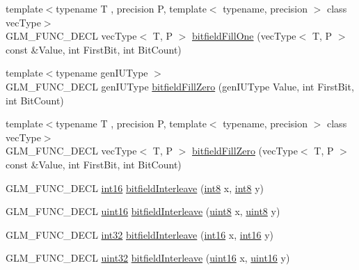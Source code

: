 \begin{DoxyCompactItemize}
\item 
{\footnotesize template$<$typename T , precision P, template$<$ typename, precision $>$ class vec\+Type$>$ }\\G\+L\+M\+\_\+\+F\+U\+N\+C\+\_\+\+D\+E\+C\+L vec\+Type$<$ T, P $>$ \hyperlink{group__gtc__bitfield_gad789042e84e8292ae95dc1af856f2ad5}{bitfield\+Fill\+One} (vec\+Type$<$ T, P $>$ const \&Value, int First\+Bit, int Bit\+Count)
\item 
{\footnotesize template$<$typename gen\+I\+U\+Type $>$ }\\G\+L\+M\+\_\+\+F\+U\+N\+C\+\_\+\+D\+E\+C\+L gen\+I\+U\+Type \hyperlink{group__gtc__bitfield_ga697b86998b7d74ee0a69d8e9f8819fee}{bitfield\+Fill\+Zero} (gen\+I\+U\+Type Value, int First\+Bit, int Bit\+Count)
\item 
{\footnotesize template$<$typename T , precision P, template$<$ typename, precision $>$ class vec\+Type$>$ }\\G\+L\+M\+\_\+\+F\+U\+N\+C\+\_\+\+D\+E\+C\+L vec\+Type$<$ T, P $>$ \hyperlink{group__gtc__bitfield_gaddba3196316b0bd240295b09b43c2958}{bitfield\+Fill\+Zero} (vec\+Type$<$ T, P $>$ const \&Value, int First\+Bit, int Bit\+Count)
\item 
G\+L\+M\+\_\+\+F\+U\+N\+C\+\_\+\+D\+E\+C\+L \hyperlink{group__gtc__type__precision_ga2945a61d12771f8954994fcddf02b021}{int16} \hyperlink{group__gtc__bitfield_ga479134317bc95d99f2b2e235d3db287b}{bitfield\+Interleave} (\hyperlink{group__gtc__type__precision_ga96254f9c1c4506fc8eb5cf3301ce8565}{int8} x, \hyperlink{group__gtc__type__precision_ga96254f9c1c4506fc8eb5cf3301ce8565}{int8} y)
\item 
G\+L\+M\+\_\+\+F\+U\+N\+C\+\_\+\+D\+E\+C\+L \hyperlink{group__gtc__type__precision_gad8c2939e1fdd8e5828b31d95c52255d5}{uint16} \hyperlink{group__gtc__bitfield_ga0700a3ceb088a0ecc23d76c154096061}{bitfield\+Interleave} (\hyperlink{group__gtc__type__precision_ga1a7dcd8aac97cc8020817c94049deff2}{uint8} x, \hyperlink{group__gtc__type__precision_ga1a7dcd8aac97cc8020817c94049deff2}{uint8} y)
\item 
G\+L\+M\+\_\+\+F\+U\+N\+C\+\_\+\+D\+E\+C\+L \hyperlink{group__gtc__type__precision_ga632d8b25f6b61659f39ea4321fab92a4}{int32} \hyperlink{group__gtc__bitfield_ga1a0264598647ae00a596865af4e1e878}{bitfield\+Interleave} (\hyperlink{group__gtc__type__precision_ga2945a61d12771f8954994fcddf02b021}{int16} x, \hyperlink{group__gtc__type__precision_ga2945a61d12771f8954994fcddf02b021}{int16} y)
\item 
G\+L\+M\+\_\+\+F\+U\+N\+C\+\_\+\+D\+E\+C\+L \hyperlink{group__gtc__type__precision_ga202b6a53c105fcb7e531f9b443518451}{uint32} \hyperlink{group__gtc__bitfield_ga19ef8360379483e3ee245e89cb62ff93}{bitfield\+Interleave} (\hyperlink{group__gtc__type__precision_gad8c2939e1fdd8e5828b31d95c52255d5}{uint16} x, \hyperlink{group__gtc__type__precision_gad8c2939e1fdd8e5828b31d95c52255d5}{uint16} y)

\end{DoxyCompactItemize}
